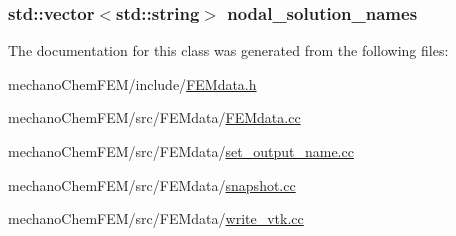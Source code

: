 \subsubsection[{nodal\-\_\-solution\-\_\-names}]{\setlength{\rightskip}{0pt plus 5cm}std\-::vector$<$std\-::string$>$ nodal\-\_\-solution\-\_\-names}\label{class_f_e_mdata_a7b00177ad21830fe46a5bf4b1b4a3ea5}


The documentation for this class was generated from the following files\-:\begin{DoxyCompactItemize}
\item 
mechano\-Chem\-F\-E\-M/include/\hyperlink{_f_e_mdata_8h}{F\-E\-Mdata.\-h}\item 
mechano\-Chem\-F\-E\-M/src/\-F\-E\-Mdata/\hyperlink{_f_e_mdata_8cc}{F\-E\-Mdata.\-cc}\item 
mechano\-Chem\-F\-E\-M/src/\-F\-E\-Mdata/\hyperlink{set__output__name_8cc}{set\-\_\-output\-\_\-name.\-cc}\item 
mechano\-Chem\-F\-E\-M/src/\-F\-E\-Mdata/\hyperlink{snapshot_8cc}{snapshot.\-cc}\item 
mechano\-Chem\-F\-E\-M/src/\-F\-E\-Mdata/\hyperlink{write__vtk_8cc}{write\-\_\-vtk.\-cc}\end{DoxyCompactItemize}
